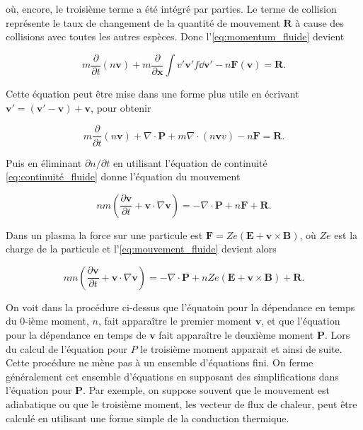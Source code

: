 \documentclass[main.tex]{subfiles}
\begin{document}
\noindent où, encore, le troisième terme a été intégré par parties.
Le terme de collision représente le taux de changement de la quantité de mouvement \( \bm{R} \) à cause des collisions avec toutes les autres espèces.
Donc l'\autoref{eq:momentum_fluide} devient

\[
	m \frac{\partial}{\partial t} \left( n \bm{v} \right) + m \frac{\partial}{\partial \bm{x}} \int v'\bm{v}' f \dd \bm{v}' - n \bm{F} \left( \bm{v} \right) = \bm{R}.
\]

\noindent Cette équation peut être mise dans une forme plus utile en écrivant \( \bm{v}' = \left( \bm{v}' - \bm{v} \right) + \bm{v} \), pour obtenir

\[
	m \frac{\partial}{\partial t} \left( n \bm{v} \right) + \nabla \cdot \bm{P} + m \nabla \cdot \left( n \bm{v} v \right) - n \bm{F} = \bm{R}.
\]

\noindent Puis en éliminant \( \partial n / \partial t \) en utilisant l'équation de continuité \ref{eq:continuité_fluide} donne l'équation du mouvement

\begin{equation}
	n m \left( \frac{\partial \bm{v}}{\partial t} + \bm{v} \cdot \nabla \bm{v} \right) = - \nabla \cdot \bm{P} + n \bm{F} + \bm{R}.
	\label{eq:mouvement_fluide}
\end{equation}

\noindent Dans un plasma la force sur une particule est \( \bm{F} = Z e \left( \bm{E} + \bm{v} \times \bm{B} \right) \), où \( Ze \) est la charge de la particule et l'\autoref{eq:mouvement_fluide} devient alors

\begin{equation}
	n m \left( \frac{\partial \bm{v}}{\partial t} + \bm{v} \cdot \nabla \bm{v} \right) = - \nabla \cdot \bm{P} + n Z e \left( \bm{E} + \bm{v} \times \bm{B} \right) + \bm{R}.
	\label{eq:mouvement_fluide_2}
\end{equation}

On voit dans la procédure ci-dessus que l'équatoin pour la dépendance en temps du 0-ième moment, \( n \), fait apparaître le premier moment \( \bm{v} \), et que l'équation pour la dépendance en temps de \( \bm{v} \) fait apparaître le deuxième moment \( \bm{P} \).
Lors du calcul de l'équation pour \( P \) le troisième moment apparait et ainsi de suite.
Cette procédure ne mène pas à un ensemble d'équations fini.
On ferme généralement cet ensemble d'équations en supposant des simplifications dans l'équation pour \( \bm{P} \).
Par exemple, on suppose souvent que le mouvement est adiabatique ou que le troisième moment, les vecteur de flux de chaleur, peut être calculé en utilisant une forme simple de la conduction thermique.
\end{document}

